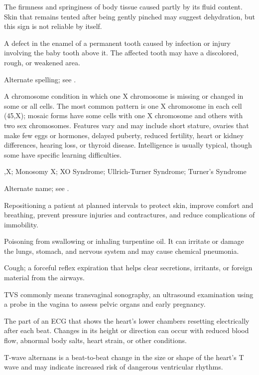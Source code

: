  The firmness and springiness of body tissue caused partly by its fluid content. Skin that remains tented after being gently pinched may suggest dehydration, but this sign is not reliable by itself.

 A defect in the enamel of a permanent tooth caused by infection or injury involving the baby tooth above it. The affected tooth may have a discolored, rough, or weakened area.

 Alternate spelling; see .

 A chromosome condition in which one X chromosome is missing or changed in some or all cells.
The most common pattern is one X chromosome in each cell (45,X); mosaic forms have some cells with one X chromosome and
others with two sex chromosomes. Features vary and may include short stature, ovaries that make few eggs or hormones,
delayed puberty, reduced fertility, heart
or kidney differences, hearing loss, or thyroid disease. Intelligence is usually typical, though some have specific learning difficulties.

,X; Monosomy X; XO Syndrome; Ullrich-Turner Syndrome; Turner's Syndrome

 Alternate name; see .

 Repositioning a patient at planned intervals to protect skin, improve comfort and breathing, prevent pressure injuries and contractures, and reduce complications of immobility.

 Poisoning from swallowing or inhaling turpentine oil. It can irritate or damage the lungs, stomach, and nervous system and may cause chemical pneumonia.

 Cough; a forceful reflex expiration that helps clear secretions, irritants, or foreign material from the airways.

 TVS commonly means transvaginal sonography, an ultrasound examination using a probe in the vagina to assess pelvic organs and early pregnancy.

 The part of an ECG that shows the heart’s lower chambers resetting electrically after each beat. Changes in its height or direction can occur with reduced blood flow, abnormal body salts, heart strain, or other conditions.

 T-wave alternans is a beat-to-beat change in the size or shape of the heart's T wave and may indicate increased risk of dangerous ventricular rhythms.

